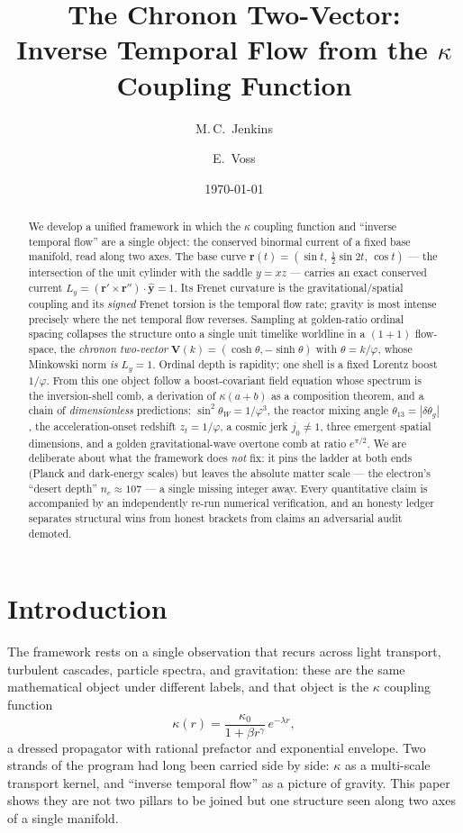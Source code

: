 \documentclass[11pt,onecolumn]{article}
\title{\bfseries The Chronon Two-Vector:\\
Inverse Temporal Flow from the $\kappa$ Coupling Function}
\author{M.\,C.\ Jenkins \and E.\ Voss}
\date{\today}
\theoremstyle{plain}
\theoremstyle{definition}
\theoremstyle{remark}
\newcommand{\phigr}{\varphi}                         %
\newcommand{\Vvec}{\mathbf{V}}                        %
\newcommand{\rap}{\theta}                             %
\newcommand{\Ly}{L_{y}}                               %
\newcommand{\rr}{\mathbf{r}}                          %
\newcommand{\half}{\tfrac12}
\begin{document}
\maketitle

\begin{abstract}
\noindent
We develop a unified framework in which the $\kappa$ coupling function and
``inverse temporal flow'' are a single object: the conserved binormal current of
a fixed base manifold, read along two axes. The base curve
$\rr(t)=(\sin t,\,\half\sin 2t,\,\cos t)$ --- the intersection of the unit cylinder
with the saddle $y=xz$ --- carries an exact conserved current $\Ly=(\rr'\times\rr'')\cdot\hat{\mathbf y}=1$.
Its Frenet curvature is the gravitational/spatial coupling and its \emph{signed}
Frenet torsion is the temporal flow rate; gravity is most intense precisely where
the net temporal flow reverses. Sampling at golden-ratio ordinal spacing collapses
the structure onto a single unit timelike worldline in a $(1{+}1)$ flow-space, the
\emph{chronon two-vector} $\Vvec(k)=(\cosh\rap,-\sinh\rap)$ with $\rap=k/\phigr$,
whose Minkowski norm \emph{is} $\Ly=1$. Ordinal depth is rapidity; one shell is a
fixed Lorentz boost $1/\phigr$. From this one object follow a boost-covariant field
equation whose spectrum is the inversion-shell comb, a derivation of $\kappa(a{+}b)$
as a composition theorem, and a chain of \emph{dimensionless} predictions:
$\sin^2\theta_W=1/\phigr^3$, the reactor mixing angle $\theta_{13}=|\delta\theta_g|$,
the acceleration-onset redshift $z_t=1/\phigr$, a cosmic jerk $j_0\neq1$, three
emergent spatial dimensions, and a golden gravitational-wave overtone comb at
ratio $e^{\pi/2}$. We are deliberate about what the framework does \emph{not} fix:
it pins the ladder at both ends (Planck and dark-energy scales) but leaves the
absolute matter scale --- the electron's ``desert depth'' $n_e\approx107$ --- a
single missing integer away. Every quantitative claim is accompanied by an
independently re-run numerical verification, and an honesty ledger separates
structural wins from honest brackets from claims an adversarial audit demoted.
\end{abstract}

\section{Introduction}\label{sec:intro}

The framework rests on a single observation that recurs across light transport,
turbulent cascades, particle spectra, and gravitation: these are the same
mathematical object under different labels, and that object is the $\kappa$
coupling function
\begin{equation}
\kappa(r)=\frac{\kappa_0}{1+\beta r^{\gamma}}\,e^{-\lambda r},
\label{eq:intro:kappa}
\end{equation}
a dressed propagator with rational prefactor and exponential envelope. Two strands
of the program had long been carried side by side: $\kappa$ as a multi-scale
transport kernel, and ``inverse temporal flow'' as a picture of gravity. This paper
shows they are not two pillars to be joined but one structure seen along two axes
of a single manifold.
\end{document}
